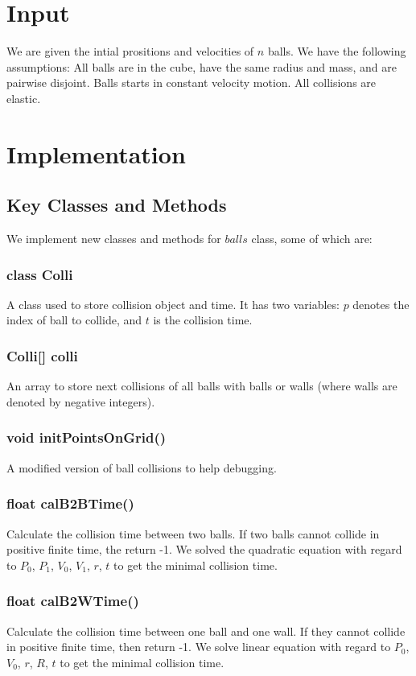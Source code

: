 \documentclass[twoside,10pt]{article}
\begin{document}
\section{Input}
We are given the intial prositions and velocities of $n$ balls. We have the following assumptions: All balls are in the cube, have the same radius and mass, and are pairwise disjoint. Balls starts in constant velocity motion. All collisions are elastic.


\section{Implementation}

\subsection{Key Classes and Methods}
We implement new classes and methods for $balls$ class, some of which are:

\subsubsection{class Colli}
A class used to store collision object and time. It has two variables: $p$ denotes the index of ball to collide, and $t$ is the collision time.

\subsubsection{Colli[] colli}
An array to store next collisions of all balls with balls or walls (where walls are denoted by negative integers).

\subsubsection{void initPointsOnGrid()}
A modified version of ball collisions to help debugging.

\subsubsection{float calB2BTime()}
Calculate the collision time between two balls. If two balls cannot collide in positive finite time, the return -1. We solved the quadratic equation with regard to $P_0$, $P_1$, $V_0$, $V_1$, $r$, $t$ to get the minimal collision time.

\subsubsection{float calB2WTime()}
Calculate the collision time between one ball and one wall. If they cannot collide in positive finite time, then return -1. We solve linear equation with regard to $P_0$, $V_0$, $r$, $R$, $t$ to get the minimal collision time.
\end{document}
